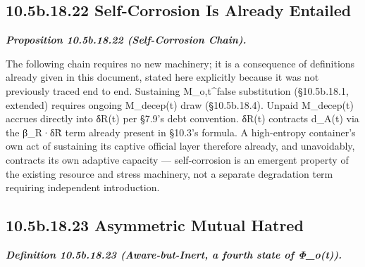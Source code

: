 \documentclass[
]{article}
\begin{document}
\hypertarget{b.18.22-self-corrosion-is-already-entailed}{%
\subsection{10.5b.18.22 Self-Corrosion Is Already
Entailed}\label{b.18.22-self-corrosion-is-already-entailed}}

\emph{\textbf{Proposition 10.5b.18.22 (Self-Corrosion Chain).}}

The following chain requires no new machinery; it is a consequence of
definitions already given in this document, stated here explicitly
because it was not previously traced end to end. Sustaining
M\_o,t\^{}false substitution (§10.5b.18.1, extended) requires ongoing
M\_decep(t) draw (§10.5b.18.4). Unpaid M\_decep(t) accrues directly into
δR(t) per §7.9's debt convention. δR(t) contracts d\_A(t) via the
β\_R·δR̃ term already present in §10.3's formula. A high-entropy
container's own act of sustaining its captive official layer therefore
already, and unavoidably, contracts its own adaptive capacity ---
self-corrosion is an emergent property of the existing resource and
stress machinery, not a separate degradation term requiring independent
introduction.

\hypertarget{b.18.23-asymmetric-mutual-hatred}{%
\subsection{10.5b.18.23 Asymmetric Mutual
Hatred}\label{b.18.23-asymmetric-mutual-hatred}}

\emph{\textbf{Definition 10.5b.18.23 (Aware-but-Inert, a fourth state of
Φ\_o(t)).}}
\end{document}
